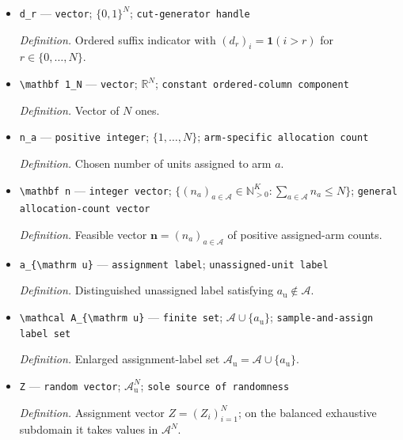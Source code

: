 \documentclass{article}
\begin{document}
\begin{itemize}
  \par\smallskip\noindent\emph{Definition.} Graph-Laplacian rank cone \(\mathcal R_K=\{G\in\mathbb S_+^K:G\mathbf 1_K=0,\ G_{ab}\leq0\text{ for all }a\neq b\}\).
  \item \texttt{d\_\allowbreak{}r} --- \texttt{vector}; \(\{0,1\}^N\); \texttt{cut-\allowbreak{}generator handle}
  \par\smallskip\noindent\emph{Definition.} Ordered suffix indicator with \((d_r)_i=\mathbf 1(i>r)\) for \(r\in\{0,\ldots,N\}\).
  \item \texttt{\textbackslash{}\allowbreak{}mathbf 1\_\allowbreak{}N} --- \texttt{vector}; \(\mathbb R^N\); \texttt{constant ordered-\allowbreak{}column component}
  \par\smallskip\noindent\emph{Definition.} Vector of \(N\) ones.
  \item \texttt{n\_\allowbreak{}a} --- \texttt{positive integer}; \(\{1,\ldots,N\}\); \texttt{arm-\allowbreak{}specific allocation count}
  \par\smallskip\noindent\emph{Definition.} Chosen number of units assigned to arm \(a\).
  \item \texttt{\textbackslash{}\allowbreak{}mathbf n} --- \texttt{integer vector}; \(\{(n_a)_{a\in\mathcal A}\in\mathbb N_{>0}^K:\sum_{a\in\mathcal A}n_a\leq N\}\); \texttt{general allocation-\allowbreak{}count vector}
  \par\smallskip\noindent\emph{Definition.} Feasible vector \(\mathbf n=(n_a)_{a\in\mathcal A}\) of positive assigned-arm counts.
  \item \texttt{a\_\allowbreak{}\{\textbackslash{}\allowbreak{}mathrm u\}\allowbreak{}} --- \texttt{assignment label}; \texttt{unassigned-\allowbreak{}unit label}
  \par\smallskip\noindent\emph{Definition.} Distinguished unassigned label satisfying \(a_{\mathrm u}\notin\mathcal A\).
  \item \texttt{\textbackslash{}\allowbreak{}mathcal A\_\allowbreak{}\{\textbackslash{}\allowbreak{}mathrm u\}\allowbreak{}} --- \texttt{finite set}; \(\mathcal A\cup\{a_{\mathrm u}\}\); \texttt{sample-\allowbreak{}and-\allowbreak{}assign label set}
  \par\smallskip\noindent\emph{Definition.} Enlarged assignment-label set \(\mathcal A_{\mathrm u}=\mathcal A\cup\{a_{\mathrm u}\}\).
  \item \texttt{Z} --- \texttt{random vector}; \(\mathcal A_{\mathrm u}^N\); \texttt{sole source of randomness}
  \par\smallskip\noindent\emph{Definition.} Assignment vector \(Z=(Z_i)_{i=1}^N\); on the balanced exhaustive subdomain it takes values in \(\mathcal A^N\).

\end{itemize}
\end{document}
